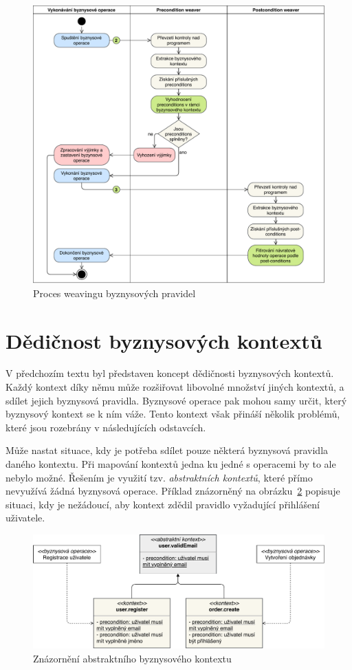 \begin{figure}
    \centering
    \includegraphics[keepaspectratio=true, width=0.8\linewidth]{figures/business-rules-weaver.pdf}
    \caption{Proces weavingu byznysov\'ych pravidel}
    \label{fig:business-rules-weaver}
\end{figure}

\section{Dědičnost byznysových kontextů}\label{sec:context-inheritance}

V předchozím textu byl představen koncept dědičnosti byznysových kontextů.
Každý kontext díky němu může rozšiřovat libovolné množství jiných kontextů, a sdílet jejich
byznysová pravidla. Byznysové operace pak mohou samy určit, který byznysový kontext se k ním váže.
Tento kontext však přináší několik problémů, které jsou rozebrány v následujících odstavcích.

Může nastat situace, kdy je potřeba sdílet pouze některá byznysová pravidla
daného kontextu. Při mapování kontextů jedna ku jedné s operacemi by to ale
nebylo možné. Řešením je využití tzv. \textit{abstraktních kontextů},
které přímo nevyužívá žádná byznysová operace.
Příklad znázorněný na obrázku~\ref{fig:abstract-context} popisuje situaci, kdy je nežádoucí,
aby kontext  zdědil pravidlo vyžadující přihlášení uživatele.

\begin{figure}
    \centering
    \includegraphics[keepaspectratio=true, width=1\linewidth]{figures/abstract-context.pdf}
    \caption{Znázornění abstraktního byznysového kontextu}
    \label{fig:abstract-context}
\end{figure}

